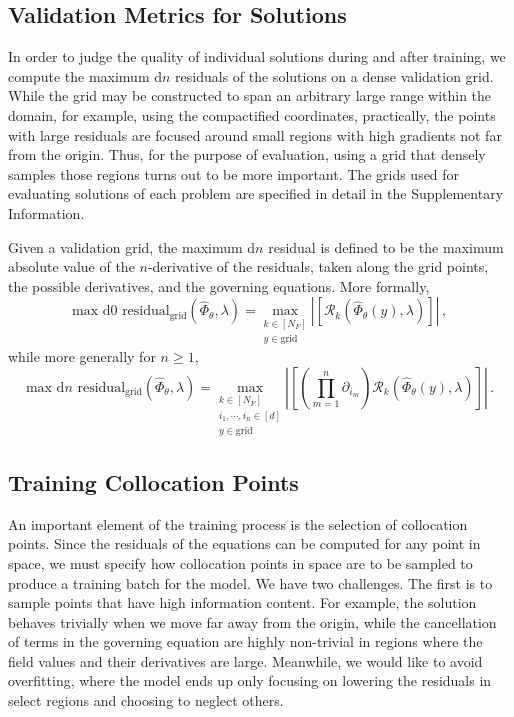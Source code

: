 \documentclass[fleqn,11pt]{wlscirep}
\begin{document}
\subsection*{Validation Metrics for Solutions}

In order to judge the quality of individual solutions during and after training, we compute the maximum d$n$ residuals of the solutions on a dense validation grid. While the grid may be constructed to span an arbitrary large range within the domain, for example, using the compactified coordinates, practically, the points with large residuals are focused around small regions with high gradients not far from the origin. Thus, for the purpose of evaluation, using a grid that densely samples those regions turns out to be more important. The grids used for evaluating solutions of each problem are specified in detail in the Supplementary Information.

Given a validation grid, the maximum d$n$ residual is defined to be the maximum absolute value of the $n$-derivative of the residuals, taken along the grid points, the possible derivatives, and the governing equations. More formally,
\begin{equation}
    \text{max d0 residual}_\text{grid} (\hat{\Phi}_\theta, \lambda) =
    \underset{\substack{k \in [N_F] \\y \in\text{grid}}}{\text{max}} \left|
    \left[ \mathcal{R}_k (\hat{\Phi}_\theta(y), \lambda)\right] \right|\,,
\end{equation}
while more generally for $n \geq 1$,
\begin{equation}
    \text{max d$n$ residual}_\text{grid} (\hat{\Phi}_\theta, \lambda) =
    \underset{\substack{k \in [N_F]\\ i_1, \cdots, i_n \in [d]\\y \in\text{grid}}}{\text{max}}
    \left| \left[ \left( \prod_{m=1}^n \partial_{i_m} \right) \mathcal{R}_k (\hat{\Phi}_\theta(y), \lambda)\right] \right| \,.
\end{equation}


\subsection*{Training Collocation Points}

An important element of the training process is the selection of collocation points. Since the residuals of the equations can be computed for any point in space, we must specify how collocation points in space are to be sampled to produce a training batch for the model. We have two challenges. The first is to sample points that have high information content. For example, the solution behaves trivially when we move far away from the origin, while the cancellation of terms in the governing equation are highly non-trivial in regions where the field values and their derivatives are large. Meanwhile, we would like to avoid overfitting, where the model ends up only focusing on lowering the residuals in select regions and choosing to neglect others.
\end{document}
